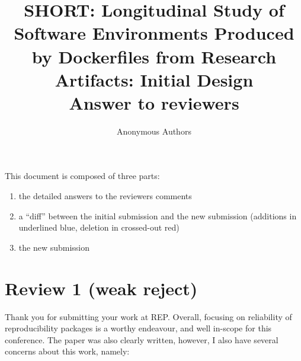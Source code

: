 \documentclass[%
	11pt,
	final,
]{article}
\title{%
  SHORT: Longitudinal Study of Software Environments Produced by Dockerfiles from Research Artifacts: Initial Design
	\\
	{\Large%
	Answer to reviewers
	}
}
\author{Anonymous Authors}
\date{}
\begin{document}
\maketitle

This document is composed of three parts:

\begin{enumerate}
\item the detailed answers to the reviewers comments
\item a ``diff'' between the initial submission and the new submission (additions in underlined blue, deletion in crossed-out red)
\item the new submission
\end{enumerate}

\section{Review 1 (weak reject)}

Thank you for submitting your work at REP. Overall, focusing on reliability of reproducibility packages is a worthy endeavour, and well in-scope for this conference. The paper was also clearly written, however, I also have several concerns about this work, namely:
\end{document}
